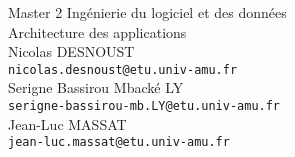 \begin{center}

{ \large 
	\vspace{5.5cm}
	Master 2 Ingénierie du logiciel et des données\\[0.2cm]
	Architecture des applications\\[3.4cm]
	Nicolas DESNOUST\\
	\texttt{nicolas.desnoust@etu.univ-amu.fr}\\[0.2cm]
	Serigne Bassirou Mbacké LY\\
	\texttt{serigne-bassirou-mb.LY@etu.univ-amu.fr}\\[0.8cm]
	Jean-Luc MASSAT\\
	\texttt{jean-luc.massat@etu.univ-amu.fr}
}

\end{center}
